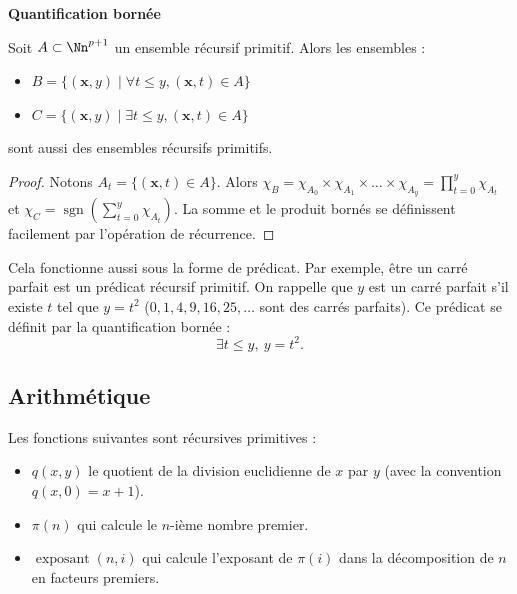 \documentclass[11pt,class=report,crop=false]{standalone}
\begin{document}
\medskip

\textbf{Quantification bornée}

\begin{proposition}
Soit $A \subset \Nn^{p+1}$ un ensemble récursif primitif.
Alors les ensembles :
\begin{itemize}
    \item $B = \big\{ (\mathbf{x},y) \mid \forall t \le y, (\mathbf{x},t) \in A \big\}$
    \item $C = \big\{ (\mathbf{x},y) \mid \exists t \le y, (\mathbf{x},t) \in A \big\}$
\end{itemize}
sont aussi des ensembles récursifs primitifs.
\end{proposition}

\begin{proof}
Notons $A_t = \{ (\mathbf{x},t) \in A \}$.
Alors $\chi_B = \chi_{A_0} \times \chi_{A_1} \times \dots \times \chi_{A_y} = \prod_{t=0}^{y} \chi_{A_t}$
et $\chi_C = \operatorname{sgn} \left( \sum_{t=0}^{y} \chi_{A_t} \right)$.
La somme et le produit bornés se définissent facilement par l'opération de récurrence.
\end{proof}

Cela fonctionne aussi sous la forme de prédicat.
Par exemple, \og{}être un carré parfait\fg{} est un prédicat récursif primitif.
On rappelle que $y$ est un carré parfait s'il existe $t$ tel que $y = t^2$
($0, 1, 4, 9, 16, 25, \dots$ sont des carrés parfaits).
Ce prédicat se définit par la quantification bornée :
\[\exists t \le y, \ y = t^2.\]


\subsection{Arithmétique}

\begin{proposition}
Les fonctions suivantes sont récursives primitives :
\begin{itemize}
    \item $q(x,y)$ le quotient de la division euclidienne de $x$ par $y$
    (avec la convention $q(x,0)=x+1$).
    \item $\pi(n)$ qui calcule le $n$-ième nombre premier.
    \item $\operatorname{exposant}(n,i)$ qui calcule l'exposant de $\pi(i)$
    dans la décomposition de $n$ en facteurs premiers.
\end{itemize}
\end{proposition}
\end{document}
